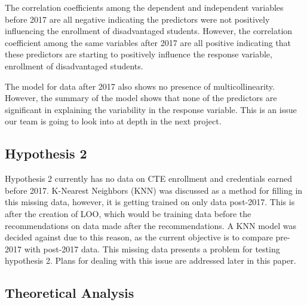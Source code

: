 

The correlation coefficients among the dependent and independent variables before 2017 are all negative indicating the predictors were not positively influencing the enrollment of disadvantaged students. 
However, the correlation coefficient among the same variables after 2017 are all positive indicating that these predictors are starting to positively influence the response variable, enrollment of disadvantaged students.

The model for data after 2017 also shows no presence of multicollinearity. 
However, the summary of the model shows that none of the predictors are  significant in explaining the variability in the response variable. 
This is an issue our team is going to look into at depth in the next project. 

\subsection{Hypothesis 2}

Hypothesis 2 currently has no data on CTE enrollment and credentials earned before 2017. K-Nearest Neighbors (KNN) was discussed as a method for filling in this missing data, however, it is getting trained on only data post-2017. 
This is after the creation of LOO, which would be training data before the recommendations on data made after the recommendations. A KNN model was decided against due to this reason, as the current objective is to compare pre-2017 with post-2017 data. 
This missing data presents a problem for testing hypothesis 2. Plans for dealing with this issue are addressed later in this paper. 


\subsection{Theoretical Analysis}

